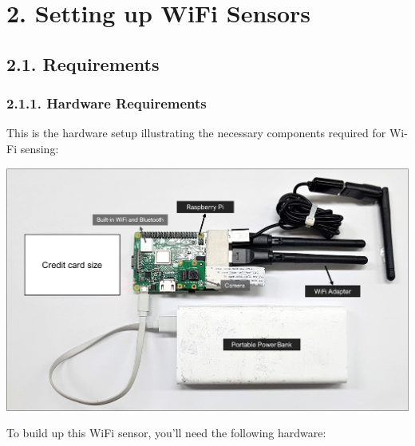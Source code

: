 \documentclass[
  letterpaper,
  DIV=11,
  numbers=noendperiod]{scrreprt}
\begin{document}

\hypertarget{section}{%
\chapter{}\label{section}}

\part{2. Setting up WiFi Sensors}

\hypertarget{requirements}{%
\chapter*{2.1. Requirements}\label{requirements}}


\hypertarget{hardware-requirements}{%
\section*{2.1.1. Hardware Requirements}\label{hardware-requirements}}


This is the hardware setup illustrating the necessary components
required for Wi-Fi sensing:

\includegraphics{content/material/ch2/sensor-comp.png}

To build up this WiFi sensor, you'll need the following hardware:
\end{document}
